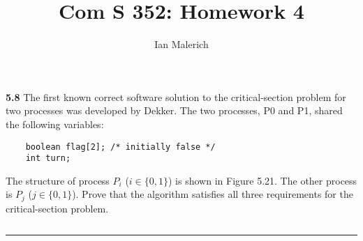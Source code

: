 \documentclass[12pt]{jhwhw}
\author{Ian Malerich}
\title{Com S 352: Homework 4}
\begin{document}
\raggedright

\textbf{5.8}  
	The first known correct software solution to the critical-section problem
	for two processes was developed by Dekker. The two processes, P0 and P1,
	shared the following variables: \\
	\begin{verbatim}
	boolean flag[2]; /* initially false */
	int turn;
	\end{verbatim}
	The structure of process $P_i$ ($i\in \{0,1\}$) is shown in Figure 5.21. The other 
	process is $P_j$ ($j\in \{0,1\}$). Prove that the algorithm satisfies all three
	requirements for the critical-section problem.

	\inputminted[linenos]{c}{5.8.c}
\textcolor[RGB]{240,240,240}{\rule{\textwidth}{0.5pt}}\bigbreak
\end{document}
